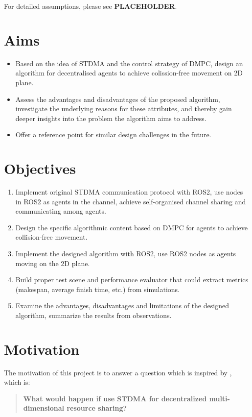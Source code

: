 For detailed assumptions, please see \textbf{PLACEHOLDER}.


\section{Aims}
\begin{itemize}
    \item Based on the idea of STDMA and the control strategy of DMPC, design an algorithm for decentralised agents to achieve colission-free movement on 2D plane.
    \item Assess the advantages and disadvantages of the proposed algorithm, investigate the underlying reasons for these attributes, and thereby gain deeper insights into the problem the algorithm aims to address. 
    \item Offer a reference point for similar design challenges in the future.
\end{itemize}
\section{Objectives}
\begin{enumerate}
    \item Implement original STDMA communication protocol with ROS2, use nodes in ROS2 as agents in the channel, achieve self-organised channel sharing and communicating among agents.
    \item Design the specific algorithmic content based on DMPC for agents to achieve collision-free movement.
    \item Implement the designed algorithm with ROS2, use ROS2 nodes as agents moving on the 2D plane.
    \item Build proper test scene and performance evaluator that could extract metrics (makespan, average finish time, etc.) from simulations.
    \item Examine the advantages, disadvantages and limitations of the designed algorithm, summarize the results from observations.
\end{enumerate}

\section{Motivation}

The motivation of this project is to answer a question which is inspired by \cite{Paper_From_Supervisor}, which is:

\begin{quote}
    \textbf{What would happen if use STDMA for decentralized multi-dimensional resource sharing?}
\end{quote}

